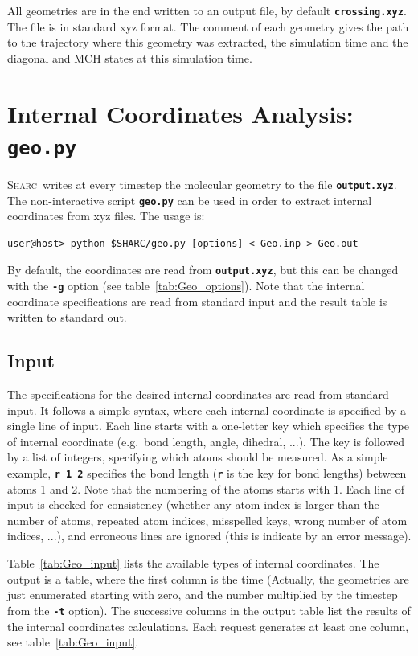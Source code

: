 \documentclass[a4paper,11pt,DIV=15,openany,twoside=false]{scrbook}
\newcommand{\sharc}{\textsc{Sharc}}
\newcommand{\ttt}[1]{\textbf{\texttt{#1}}}
\begin{document}
All geometries are in the end written to an output file, by default \ttt{crossing.xyz}. The file is in standard xyz format. The comment of each geometry gives the path to the trajectory where this geometry was extracted, the simulation time and the diagonal and MCH states at this simulation time. 





\section{Internal Coordinates Analysis: \ttt{geo.py}}\label{sec:geo.py}

\sharc\ writes at every timestep the molecular geometry to the file \ttt{output.xyz}. The non-interactive script \ttt{geo.py} can be used in order to extract internal coordinates from xyz files. The usage is:
\begin{verbatim}
user@host> python $SHARC/geo.py [options] < Geo.inp > Geo.out
\end{verbatim}
By default, the coordinates are read from \ttt{output.xyz}, but this can be changed with the \ttt{-g} option (see table~\ref{tab:Geo_options}). Note that the internal coordinate specifications are read from standard input and the result table is written to standard out. 

\subsection{Input}

The specifications for the desired internal coordinates are read from standard input. It follows a simple syntax, where each internal coordinate is specified by a single line of input. Each line starts with a one-letter key which specifies the type of internal coordinate (e.g.\ bond length, angle, dihedral, ...). The key is followed by a list of integers, specifying which atoms should be measured. As a simple example, \ttt{r 1 2} specifies the bond length (\ttt{r} is the key for bond lengths) between atoms 1 and 2. Note that the numbering of the atoms starts with 1. Each line of input is checked for consistency (whether any atom index is larger than the number of atoms, repeated atom indices, misspelled keys, wrong number of atom indices, ...), and erroneous lines are ignored (this is indicate by an error message).

Table~\ref{tab:Geo_input} lists the available types of internal coordinates. The output is a table, where the first column is the time (Actually, the geometries are just enumerated starting with zero, and the number multiplied by the timestep from the \ttt{-t} option). The successive columns in the output table list the results of the internal coordinates calculations. Each request generates at least one column, see table~\ref{tab:Geo_input}. 
\end{document}

